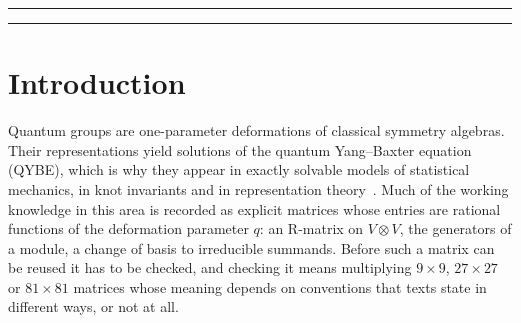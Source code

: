 \documentclass{SciPost}
\begin{document}
\noindent\textcolor{white!90!black}{%
}


\linenumbers

\vspace{10pt}
\noindent\rule{\textwidth}{1pt}
\setcounter{tocdepth}{1}
\tableofcontents
\noindent\rule{\textwidth}{1pt}
\vspace{10pt}


\section{Introduction}
\label{sec:intro}

Quantum groups are one-parameter deformations of classical symmetry algebras. Their representations yield solutions of the quantum Yang--Baxter equation (QYBE), which is why they appear in exactly solvable models of statistical mechanics, in knot invariants and in representation theory~\cite{drinfeld1987,jimbo1985,jimbo1986,kassel1995}. Much of the working knowledge in this area is recorded as explicit matrices whose entries are rational functions of the deformation parameter $q$: an R-matrix on $V\otimes V$, the generators of a module, a change of basis to irreducible summands. Before such a matrix can be reused it has to be checked, and checking it means multiplying $9\times9$, $27\times27$ or $81\times81$ matrices whose meaning depends on conventions that texts state in different ways, or not at all.
\end{document}
